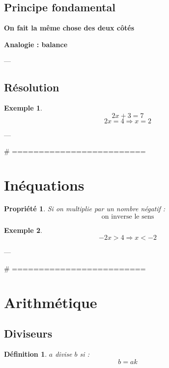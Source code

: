 \documentclass[11pt,a4paper]{article}
\newtheorem{definition}{Définition}
\newtheorem{property}{Propriété}
\newtheorem{example}{Exemple}
\begin{document}
\subsection{Principe fondamental}

\begin{center}
\textbf{On fait la même chose des deux côtés}
\end{center}

\textbf{Analogie : balance}

\begin{center}
\end{center}

---

\subsection{Résolution}

\begin{example}
\[
2x + 3 = 7
\]
\[
2x = 4
\Rightarrow x = 2
\]
\end{example}

---

# =========================
\section{Inéquations}

\begin{property}
Si on multiplie par un nombre négatif :
\[
\text{on inverse le sens}
\]
\end{property}

\begin{example}
\[
-2x > 4 \Rightarrow x < -2
\]
\end{example}

---

# =========================
\section{Arithmétique}

\subsection{Diviseurs}

\begin{definition}
$a$ divise $b$ si :
\[
b = ak
\]
\end{definition}
\end{document}
